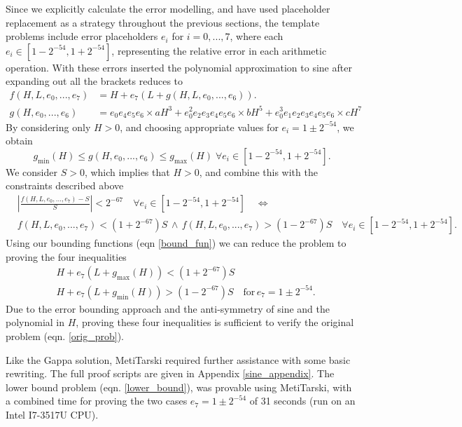 \documentclass{fac}
\begin{document}
Since we explicitly calculate the error modelling, and have used placeholder replacement as a strategy throughout the previous sections, the template problems include error placeholders $e_i$ for $i=0,...,7$, where each $e_i \in [1-2^{-54},1+2^{-54}]$, representing the relative error in each arithmetic operation. With these errors inserted the polynomial approximation to sine after expanding out all the brackets reduces to
\begin{align*}
    f(H,L, e_0,..., e_7) &= H + e_7(L + g(H,L, e_0,..., e_6)).\\
    g(H, e_0,..., e_6) &= e_0e_4e_5e_6\times aH^3 + e_0^2e_2e_3e_4e_5e_6\times bH^5 + e_0^3e_1e_2e_3e_4e_5e_6\times cH^7
\end{align*}
By considering only $H>0$, and choosing appropriate values for $e_i=1\pm 2^{-54}$, we obtain 
\begin{equation} \label{bound_fun}
g_{\textrm{min}}(H) \leq g(H,e_0,...,e_6) \leq g_{\textrm{max}}(H) \; \forall e_i \in [1-2^{-54},1+2^{-54}].
\end{equation}
We consider $S>0$, which implies that $H>0$, and combine this with the constraints described above 
\begin{align}
    &\left|\frac{f(H,L, e_0,...,e_7)-S}{S}\right|<2^{-67} \quad \forall e_i \in [1-2^{-54},1+2^{-54}] \label{orig_prob} \quad \Leftrightarrow \\
    & f(H,L,e_0,...,e_7) < (1+2^{-67}) S \, \land \, f(H,L,e_0,...,e_7) > (1-2^{-67}) S \quad \forall e_i \in [1-2^{-54},1+2^{-54}].
\end{align}
Using our bounding functions (eqn \ref{bound_fun}) we can reduce the problem to proving the four inequalities
\begin{align}
    &H + e_7(L+g_{\textrm{max}}(H)) < (1+2^{-67}) S\label{upper_bound} \\
    &H + e_7(L+g_{\textrm{min}}(H)) > (1-2^{-67}) S\label{lower_bound} \quad \textrm{for}\,  e_7=1\pm2^{-54}.
\end{align}
Due to the error bounding approach and the anti-symmetry of sine and the polynomial in $H$, proving these four inequalities is sufficient to verify the original problem (eqn. \ref{orig_prob}).

Like the Gappa solution, MetiTarski required further assistance with some basic rewriting. The full proof scripts are given in Appendix \ref{sine_appendix}. The lower bound problem (eqn. \ref{lower_bound}), was provable using MetiTarski, with a combined time for proving the two cases $e_7=1\pm2^{-54}$ of 31 seconds (run on an Intel I7-3517U CPU).
\end{document}

